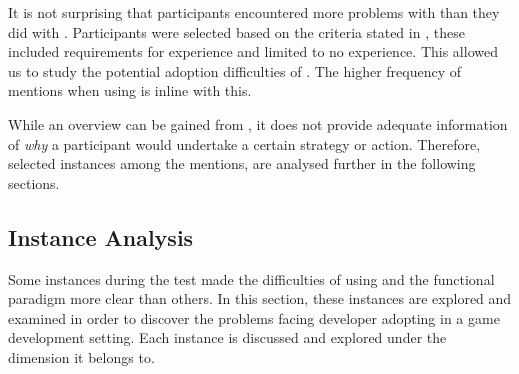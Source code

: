 It is not surprising that participants encountered more problems with \fs than they did with \cs. Participants were selected based on the criteria stated in , these included requirements for \cs experience and limited to no  \fs experience. This allowed us to study the potential adoption difficulties of \fs. The higher frequency of mentions when using \fs is inline with this.

While an overview can be gained from , it does not provide adequate information of \textit{why} a participant would undertake a certain strategy or action. Therefore, selected instances among the mentions, are analysed further in the following sections.

\subsection{Instance Analysis}
Some instances during the test made the difficulties of using \fs and the functional paradigm more clear than others. In this section, these instances are explored and examined in order to discover the problems facing developer adopting \fs in a game development setting. Each instance is discussed and explored under the dimension it belongs to.





